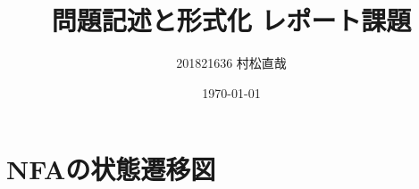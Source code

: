 \documentclass[pdflatex,ja=standard]{bxjsarticle}
\title{問題記述と形式化 レポート課題}
\author{201821636 村松直哉}
\date{\today}
\begin{document}
\maketitle
%
%

\section{NFAの状態遷移図}


\clearpage



\end{document}
